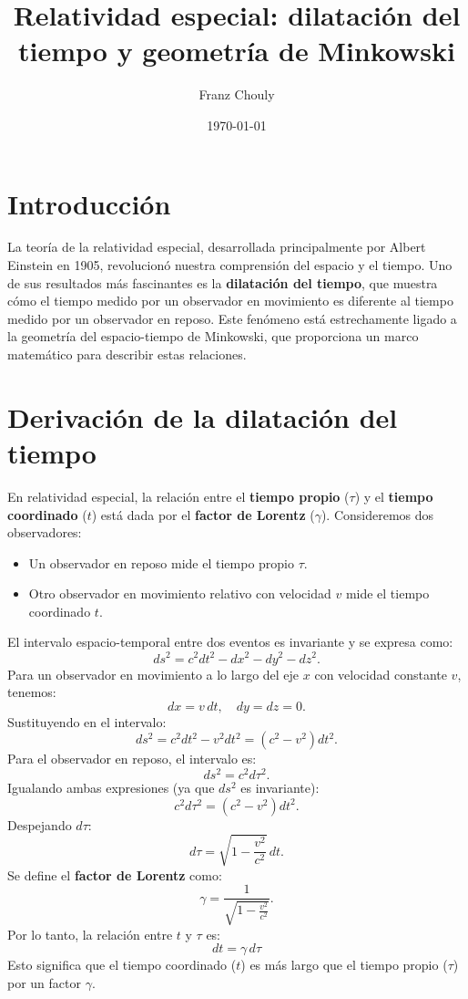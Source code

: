 \documentclass{article}
\title{Relatividad especial: dilatación del tiempo y geometría de Minkowski}
\author{Franz Chouly}
\date{\today}
\begin{document}
\maketitle

\section{Introducción}
La teoría de la relatividad especial, desarrollada principalmente por Albert Einstein en 1905, revolucionó nuestra comprensión del espacio y el tiempo. Uno de sus resultados más fascinantes es la \textbf{dilatación del tiempo}, que muestra cómo el tiempo medido por un observador en movimiento es diferente al tiempo medido por un observador en reposo. Este fenómeno está estrechamente ligado a la geometría del espacio-tiempo de Minkowski, que proporciona un marco matemático para describir estas relaciones.

\section{Derivación de la dilatación del tiempo}
En relatividad especial, la relación entre el \textbf{tiempo propio} ($\tau$) y el \textbf{tiempo coordinado} ($t$) está dada por el \textbf{factor de Lorentz} ($\gamma$). Consideremos dos observadores:
\begin{itemize}
    \item Un observador en reposo mide el tiempo propio $\tau$.
    \item Otro observador en movimiento relativo con velocidad $v$ mide el tiempo coordinado $t$.
\end{itemize}
El intervalo espacio-temporal entre dos eventos es invariante y se expresa como:
\[
ds^2 = c^2 dt^2 - dx^2 - dy^2 - dz^2.
\]
Para un observador en movimiento a lo largo del eje $x$ con velocidad constante $v$, tenemos:
\[
dx = v \, dt, \quad dy = dz = 0.
\]
Sustituyendo en el intervalo:
\[
ds^2 = c^2 dt^2 - v^2 dt^2 = (c^2 - v^2) dt^2.
\]
Para el observador en reposo, el intervalo es:
\[
ds^2 = c^2 d\tau^2.
\]
Igualando ambas expresiones (ya que $ds^2$ es invariante):
\[
c^2 d\tau^2 = (c^2 - v^2) dt^2.
\]
Despejando $d\tau$:
\[
d\tau = \sqrt{1 - \frac{v^2}{c^2}} \, dt.
\]
Se define el \textbf{factor de Lorentz} como:
\[
\gamma = \frac{1}{\sqrt{\displaystyle 1 - \frac{v^2}{c^2}}}.
\]
Por lo tanto, la relación entre $t$ y $\tau$ es:
\[
dt = \gamma \, d\tau
\]
Esto significa que el tiempo coordinado ($t$) es más largo que el tiempo propio ($\tau$) por un factor $\gamma$.
\end{document}
